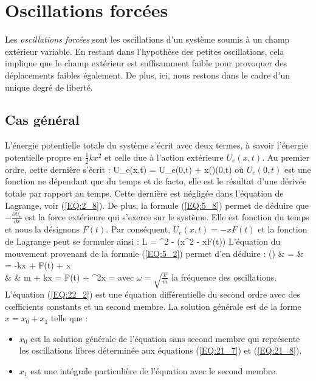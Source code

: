 \section{Oscillations forc\'ees}\label{PAR:22}

Les \emph{oscillations forc\'ees} sont les oscillations d'un syst\`eme soumis \`a un champ ext\'erieur variable. En restant dans l'hypoth\`ese des petites oscillations, cela implique que le champ ext\'erieur est suffisamment faible pour provoquer des d\'eplacements faibles \'egalement. De plus, ici, nous restons dans le cadre d'un unique degr\'e de libert\'e.

\subsection{Cas g\'en\'eral}

L'\'energie potentielle totale du syst\`eme s'\'ecrit avec deux termes, \`a savoir l'\'energie potentielle propre en $\frac{1}{2}kx^{2}$ et celle due \`a l'action ext\'erieure $U_{e}(x,t)$. Au premier ordre, cette derni\`ere s'\'ecrit :
\benn
	U_{e}(x,t) = U_{e}(0,t) + x\left(\right)(0,t)
\eenn
o\`u $U_{e}(0,t)$ est une fonction ne d\'ependant que du temps et de facto, elle est le r\'esultat d'une d\'eriv\'ee totale par rapport au temps. Cette derni\`{e}re est n\'eglig\'ee dans l'\'equation de Lagrange, voir (\ref{EQ:2_8}). De plus, la formule (\ref{EQ:5_8}) permet de d\'eduire que $-\frac{\partial U_{e}}{\partial x}$ est la force ext\'erieure qui s'exerce sur le syst\`eme. Elle est fonction du temps et nous la d\'esignons $F(t)$. Par cons\'equent, $U_{e}(x,t) = -xF(t)$ et la fonction de Lagrange peut se formuler ainsi :
\be
	L = ^{2} - \left(x^{2} - xF(t)\right) \label{EQ:22_1}
\ee
L'\'equation du mouvement provenant de la formule (\ref{EQ:5_2}) permet d'en d\'eduire :
\bea
	\left(\right) & = &  \Leftrightarrow {} = -kx + F(t) + x \nonumber \\
	& \Leftrightarrow & m + kx = F(t) \Leftrightarrow {} + \omega^{2}x =  \label{EQ:22_2}
\eea
avec $\omega = \sqrt{\frac{k}{m}}$ la fr\'equence des oscillations. L'\'equation (\ref{EQ:22_2}) est une \'equation diff\'erentielle du second ordre avec des c{\oe}fficients constants et un second membre. La solution g\'en\'erale est de la forme $x = x_{0} + x_{1}$ telle que :
\begin{itemize}
	\item $x_{0}$ est la solution g\'en\'erale de l'\'equation sans second membre qui repr\'esente les oscillations libres d\'etermin\'ee aux \'equations (\ref{EQ:21_7}) et (\ref{EQ:21_8}),
	\item $x_{1}$ est une int\'egrale particuli\`ere de l'\'equation avec le second membre.
\end{itemize}

